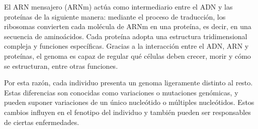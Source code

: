 \documentclass[11pt,spanish,listoffigures,listoftables]{tfgetsinf}
\begin{document}
El ARN mensajero (ARNm) actúa como intermediario entre el \ac{ADN} y las proteínas de la siguiente manera: mediante el proceso de traducción, los ribosomas convierten cada molécula de \ac{ARN}m en una proteína, es decir, en una secuencia de aminoácidos. Cada proteína adopta una estructura tridimensional compleja y funciones específicas. Gracias a la interacción entre el ADN, \ac{ARN} y proteínas, el genoma es capaz de regular qué células deben crecer, morir y cómo se estructuran, entre otras funciones\cite{RIN}. 


Por esta razón, cada individuo presenta un genoma ligeramente distinto al resto. Estas diferencias son conocidas como variaciones o mutaciones genómicas, y pueden suponer variaciones de un único nucleótido o múltiples nucleótidos. Estos cambios influyen en el fenotipo del individuo y también pueden ser responsables de ciertas enfermedades. 
\end{document}
